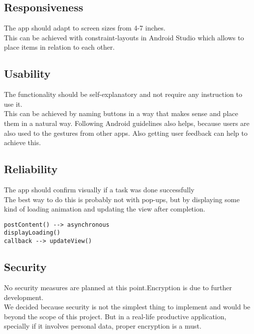 \documentclass[conference]{IEEEtran}
\numberwithin{figure}{subsection}
\begin{document}
\subsection{Responsiveness}
The  app  should  adapt  to  screen  sizes from 4-7 inches.\\

This can be achieved with constraint-layouts in Android Studio which allows to place items in relation to each other.\\


\subsection{Usability}
The  functionality  should  be  self-explanatory and not require any instruction to use it.\\

This can be achieved by naming buttons in a way that makes sense and place them in a natural way. Following Android guidelines also helps, because users are also used to the gestures from other apps. Also getting user feedback can help to achieve this.\\


\subsection{Reliability}
The  app  should  confirm  visually  if  a  task was done successfully\\

The best way to do this is probably not with pop-ups, but by displaying some kind of loading animation and updating the view after completion.

\begin{lstlisting}
postContent() --> asynchronous
displayLoading()
callback --> updateView()
\end{lstlisting}


\subsection{Security}
No security measures are planned at this point.Encryption is due to further development.\\

We decided because security is not the simplest thing to implement and would be beyond the scope of this project. But in a real-life productive application, specially if it involves personal data, proper encryption is a must.\\
\end{document}
